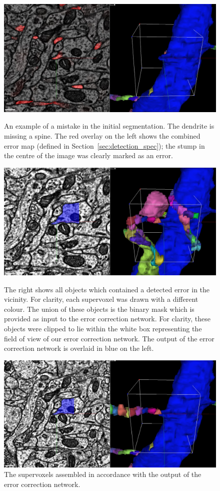 \documentclass{article}
\begin{document}
\begin{figure}
\begin{center}
	\includegraphics[width=0.65\linewidth]{errors.jpg}
	\caption{An example of a mistake in the initial segmentation. The dendrite is missing a spine. The red overlay on the left shows the combined error map (defined in Section~\ref{sec:detection_spec}); the stump in the centre of the image was clearly marked as an error.}

	\includegraphics[width=0.65\linewidth]{neighbours.jpg}
	\caption{The right shows all objects which contained  a detected error in the vicinity. For clarity, each supervoxel was drawn with a different colour. The union of these objects is the binary mask which is provided as input to the error correction network. For clarity, these objects were clipped to lie within the white box representing the field of view of our error correction network. The output of the error correction network is overlaid in blue on the left.}

	\includegraphics[width=0.65\linewidth]{final.jpg}
	\caption{The supervoxels assembled in accordance with the output of the error correction network.}
\end{center}
\end{figure}
\end{document}
